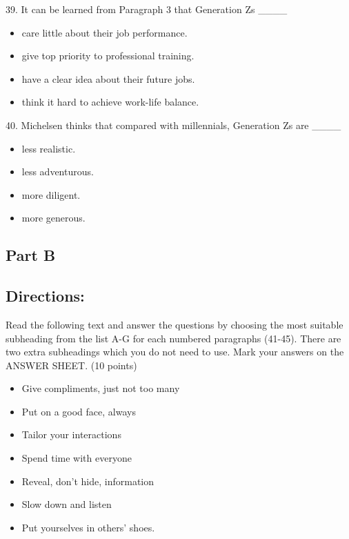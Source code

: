 \documentclass[UTF8,11pt]{ctexart}
\begin{document}
39. It can be learned from Paragraph 3 that Generation Zs \_\_\_\_


\begin{itemize}[leftmargin=2em,itemsep=.2em,topsep=.4em]\item[A.] care little about their job performance.
\item[B.] give top priority to professional training.
\item[C.] have a clear idea about their future jobs.
\item[D.] think it hard to achieve work-life balance.
\end{itemize}

40. Michelsen thinks that compared with millennials, Generation Zs are \_\_\_\_


\begin{itemize}[leftmargin=2em,itemsep=.2em,topsep=.4em]\item[A.] less realistic.
\item[B.] less adventurous.
\item[C.] more diligent.
\item[D.] more generous.
\end{itemize}

\subsection*{\textbf{Part B}}


\subsection*{\textbf{Directions:}}


Read the following text and answer the questions by choosing the most suitable subheading from the list A-G for each numbered paragraphs (41-45). There are two extra subheadings which you do not need to use. Mark your answers on the ANSWER SHEET. (10 points)


\begin{itemize}[leftmargin=2em,itemsep=.2em,topsep=.4em]\item[A.] Give compliments, just not too many
\item[B.] Put on a good face, always
\item[C.] Tailor your interactions
\item[D.] Spend time with everyone
\item[E.] Reveal, don’t hide, information
\item[F.] Slow down and listen
\item[G.] Put yourselves in others’ shoes.
\end{itemize}
\end{document}
